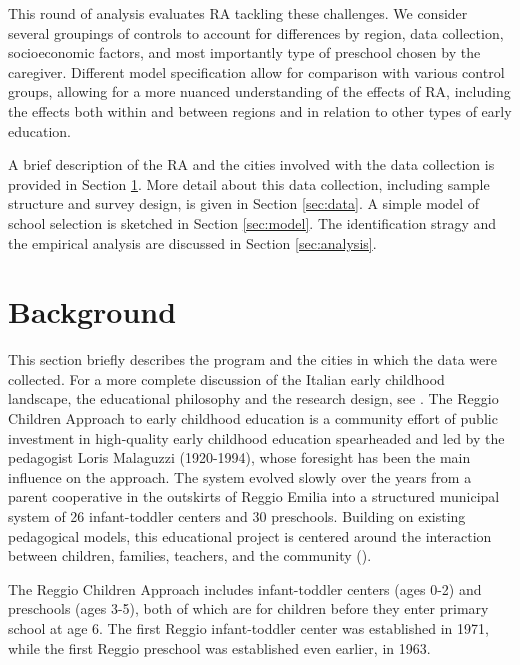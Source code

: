 \documentclass[12pt]{article}
\begin{document}
This round of analysis evaluates RA tackling these challenges. We consider several groupings of controls to account for differences by region, data collection, socioeconomic factors, and most importantly type of preschool chosen by the caregiver. %
Different model specification allow for comparison with various control groups, allowing for a more nuanced understanding of the effects of RA, including the effects both within and between regions and in relation to other types of early education.


A brief description of the RA and the cities involved with the data collection is provided in Section \ref{sec:background}. More detail about this data collection, including sample structure and survey design, is given in Section \ref{sec:data}. A simple model of school selection is sketched in Section \ref{sec:model}. The identification stragy and the empirical analysis are discussed in Section \ref{sec:analysis}.

%
\section{Background}
\label{sec:background}

This section briefly describes the program and the cities in which the data were collected. For a more complete discussion of the Italian early childhood landscape, the educational philosophy and the research design, see \citet{biroli2015evaluating}. The Reggio Children Approach to early childhood education is a community effort of public investment in high-quality early childhood education spearheaded and led by the pedagogist Loris Malaguzzi (1920-1994), whose foresight has been the main influence on the approach. The system evolved slowly over the years from a parent cooperative in the outskirts of Reggio Emilia into a structured municipal system of 26 infant-toddler centers and 30 preschools. Building on existing pedagogical models, this educational project is centered around the interaction between children, families, teachers, and the community (\cite{Malaguzzi1993}).

The Reggio Children Approach includes infant-toddler centers (ages 0-2) and preschools (ages 3-5), both of which are for children before they enter primary school at age 6. The first Reggio infant-toddler center was established in 1971, while the first Reggio preschool was established even earlier, in 1963. 
\end{document}
